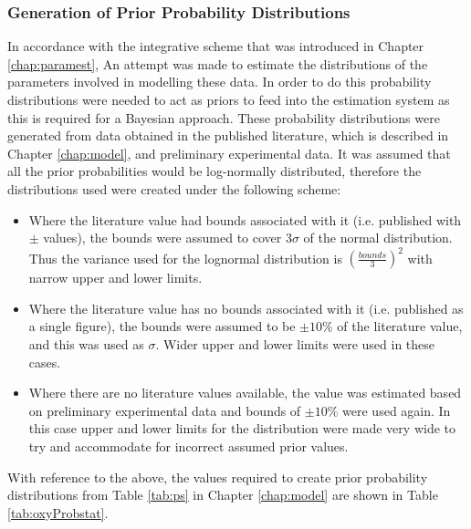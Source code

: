 \subsubsection{Generation of Prior Probability Distributions}
In accordance with the integrative scheme that was introduced in Chapter \ref{chap:paramest}, An attempt was made to estimate the distributions of the parameters involved in modelling these data. In order to do this probability distributions were needed to act as priors to feed into the estimation system as this is required for a Bayesian approach. These probability distributions were generated from data obtained in the published literature, which is described in Chapter \ref{chap:model}, and preliminary experimental data. It was assumed that all the prior probabilities would be log-normally distributed, therefore the distributions  used were created under the following scheme:
\begin{itemize}
	\item Where the literature value had bounds associated with it (i.e. published with $\pm{}$ values), the bounds were assumed to cover $3 \sigma$ of the normal distribution. Thus the variance used for the lognormal distribution is $\left(\frac{bounds}{3}\right)^2$ with narrow upper and lower limits.
	\item Where the literature value has no bounds associated with it (i.e. published as a single figure), the bounds were assumed to be $\pm 10\%$ of the literature value, and this was used as $\sigma$. Wider upper and lower limits were used in these cases.
	\item Where there are no literature values available, the value was estimated based on preliminary experimental data and bounds of $\pm 10\%$ were used again. In this case upper and lower limits for the distribution were made very wide to try and accommodate for incorrect assumed prior values.
\end{itemize}

\noindent With reference to the above, the values required to create prior probability distributions from Table \ref{tab:ps} in Chapter \ref{chap:model} are shown in Table \ref{tab:oxyProbstat}.

